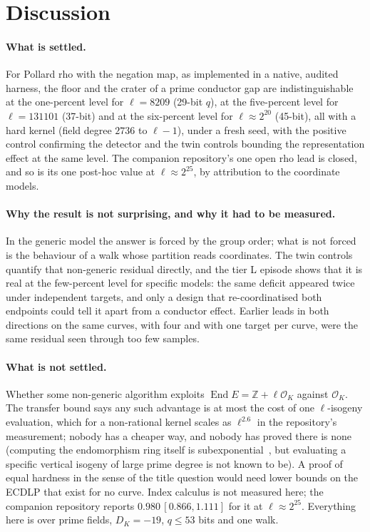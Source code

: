 \documentclass[10pt,a4paper]{article}
\newcommand{\ZZ}{\mathbb{Z}}
\newcommand{\OK}{\mathcal{O}_K}
\newcommand{\End}{\operatorname{End}}
\theoremstyle{remark}
\begin{document}
\section{Discussion}

\paragraph{What is settled.}
For Pollard rho with the negation map, as implemented in a native,
audited harness, the floor and the crater of a prime conductor gap are
indistinguishable at the one-percent level for $\ell = 8209$ (29-bit
$q$), at the five-percent level for $\ell = 131101$ (37-bit) and at the
six-percent level for $\ell \approx 2^{20}$ (45-bit), all with a hard
kernel (field degree $2736$ to $\ell - 1$), under a fresh seed, with the
positive control confirming the detector and the twin controls bounding
the representation effect at the same level. The companion repository's
one open rho lead is closed, and so is its one post-hoc value at
$\ell \approx 2^{25}$, by attribution to the coordinate models.

\paragraph{Why the result is not surprising, and why it had to be measured.}
In the generic model the answer is forced by the group order; what is not
forced is the behaviour of a walk whose partition reads coordinates. The
twin controls quantify that non-generic residual directly, and the tier L
episode shows that it is real at the few-percent level for specific
models: the same deficit appeared twice under independent targets, and
only a design that re-coordinatised both endpoints could tell it apart
from a conductor effect. Earlier leads in both directions on the same
curves, with four and with one target per curve, were the same residual
seen through too few samples.

\paragraph{What is not settled.}
Whether some non-generic algorithm exploits $\End E = \ZZ + \ell\OK$
against $\OK$. The transfer bound says any such advantage is at most the
cost of one $\ell$-isogeny evaluation, which for a non-rational kernel
scales as $\ell^{2.6}$ in the repository's measurement; nobody has a
cheaper way, and nobody has proved there is none (computing the
endomorphism ring itself is subexponential~\cite{BissonSutherland2011},
but evaluating a specific vertical isogeny of large prime degree is not
known to be). A proof of equal hardness in the sense of the title
question would need lower bounds on the ECDLP that exist for no curve.
Index calculus is not measured here; the companion repository reports
$0.980\,[0.866, 1.111]$ for it at $\ell \approx 2^{25}$. Everything here
is over prime fields, $D_K = -19$, $q \le 53$ bits and one walk.
\end{document}
